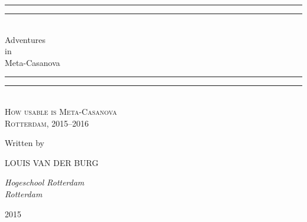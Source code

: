 \newcommand*{\titleGP}{\begingroup %
\centering %
\vspace*{\baselineskip} %

\rule{\textwidth}{1.6pt}\vspace*{-\baselineskip}\vspace*{2pt} %
\rule{\textwidth}{0.4pt}\\[0.5\baselineskip] %

{\LARGE Adventures\\ [0.0\baselineskip] in\\ [0.4\baselineskip] Meta-Casanova }\\[0.2\baselineskip] %

\rule{\textwidth}{0.4pt}\vspace*{-\baselineskip}\vspace{3.2pt} %
\rule{\textwidth}{1.6pt}\\[\baselineskip] %

\scshape %
How usable is Meta-Casanova\\[\baselineskip] %
Rotterdam,  2015--2016\par %

\vspace*{3\baselineskip} %

Written by \\[0.3\baselineskip]
{\Large LOUIS VAN DER BURG \par} %
{\itshape Hogeschool Rotterdam \\ Rotterdam\par} %

\vspace*{1.5\baselineskip} %

\vfill %

{\scshape 2015} \\[0.3\baselineskip] %

\endgroup}


%


\titleGP %

%
